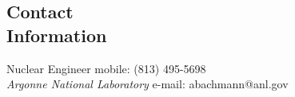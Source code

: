 \documentclass[margin,line]{resume}
\begin{document}
\begin{resume}



    \section{\mysidestyle Contact\\Information}
    Nuclear Engineer \hfill mobile: (813) 495-5698 \vspace{0mm}\\\vspace{0mm}%
    \textsl{Argonne National Laboratory} \hfill e-mail: abachmann@anl.gov           \vspace{0mm}\\\vspace{0mm}%
    \vspace{-2mm}\\\vspace{-10mm}%


\end{resume}
\end{document}
